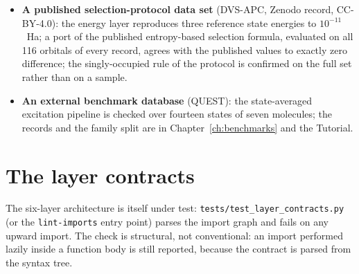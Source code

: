 \begin{itemize}
  \item \textbf{A published selection-protocol data set} (DVS-APC,
    Zenodo record, CC-BY-4.0): the energy layer reproduces three
    reference state energies to $10^{-11}$~Ha; a port of the
    published entropy-based selection formula, evaluated on all 116
    orbitals of every record, agrees with the published values to
    exactly zero difference; the singly-occupied rule of the protocol
    is confirmed on the full set rather than on a sample.
  \item \textbf{An external benchmark database} (QUEST): the
    state-averaged excitation pipeline is checked over fourteen
    states of seven molecules; the records and the family split are
    in Chapter~\ref{ch:benchmarks} and the Tutorial.
\end{itemize}

\section{The layer contracts}

The six-layer architecture is itself under test:
\texttt{tests/\allowbreak test\_layer\_\allowbreak contracts.py} (or the
\texttt{lint-imports} entry point) parses the import graph and fails
on any upward import.  The check is structural, not conventional: an
import performed lazily inside a function body is still reported,
because the contract is parsed from the syntax tree.
